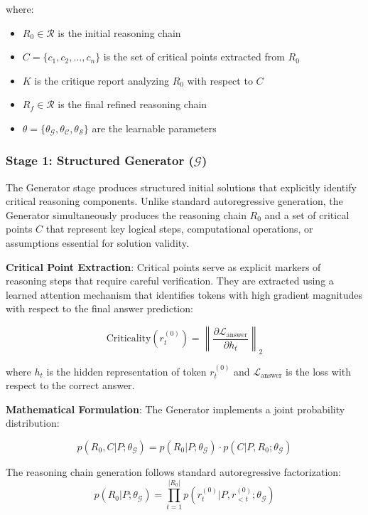 \documentclass[10pt,twocolumn]{article}
\newcommand{\Generator}{\mathcal{G}}
\newcommand{\Critic}{\mathcal{C}}
\newcommand{\Synthesizer}{\mathcal{S}}
\begin{document}
where:
\begin{itemize}[leftmargin=*]
\item $R_0 \in \mathcal{R}$ is the initial reasoning chain
\item $C = \{c_1, c_2, \ldots, c_n\}$ is the set of critical points extracted from $R_0$
\item $K$ is the critique report analyzing $R_0$ with respect to $C$
\item $R_f \in \mathcal{R}$ is the final refined reasoning chain
\item $\theta = \{\theta_\Generator, \theta_\Critic, \theta_\Synthesizer\}$ are the learnable parameters
\end{itemize}

\subsubsection{Stage 1: Structured Generator ($\Generator$)}

The Generator stage produces structured initial solutions that explicitly identify critical reasoning components. Unlike standard autoregressive generation, the Generator simultaneously produces the reasoning chain $R_0$ and a set of critical points $C$ that represent key logical steps, computational operations, or assumptions essential for solution validity.

\textbf{Critical Point Extraction}: Critical points serve as explicit markers of reasoning steps that require careful verification. They are extracted using a learned attention mechanism that identifies tokens with high gradient magnitudes with respect to the final answer prediction:

\begin{equation}
\text{Criticality}(r_t^{(0)}) = \left\|\frac{\partial \mathcal{L}_{\text{answer}}}{\partial h_t}\right\|_2
\end{equation}

where $h_t$ is the hidden representation of token $r_t^{(0)}$ and $\mathcal{L}_{\text{answer}}$ is the loss with respect to the correct answer.

\textbf{Mathematical Formulation}: The Generator implements a joint probability distribution:

\begin{equation}
p(R_0, C | P; \theta_\Generator) = p(R_0 | P; \theta_\Generator) \cdot p(C | P, R_0; \theta_\Generator)
\end{equation}

The reasoning chain generation follows standard autoregressive factorization:
\begin{equation}
p(R_0 | P; \theta_\Generator) = \prod_{t=1}^{|R_0|} p(r_t^{(0)} | P, r_{<t}^{(0)}; \theta_\Generator)
\end{equation}
\end{document}
